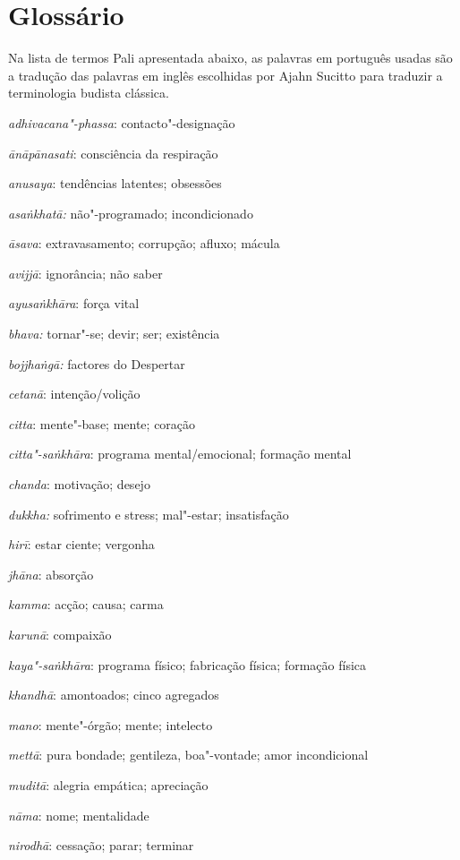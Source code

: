 {  \section{Glossário}\label{glossuxe1rio}

  Na lista de termos Pali apresentada abaixo, as palavras em português usadas são a tradução das palavras em inglês escolhidas por Ajahn Sucitto para traduzir a terminologia budista clássica.

  \emph{adhivacana"-phassa}: contacto"-designação

  \emph{ānāpānasati}: consciência da respiração

  \emph{anusaya}: tendências latentes; obsessões

  \emph{asaṅkhatā:} não"-programado; incondicionado

  \emph{āsava}: extravasamento; corrupção; afluxo; mácula

  \emph{avijjā}: ignorância; não saber

  \emph{ayusaṅkhāra}: força vital

  \emph{bhava:} tornar"-se; devir; ser; existência

  \emph{bojjhaṅgā:} factores do Despertar

  \emph{cetanā}: intenção/volição

  \emph{citta}: mente"-base; mente; coração

  \emph{citta"-saṅkhāra}: programa mental/emocional; formação mental

  \emph{chanda}: motivação; desejo

  \emph{dukkha:} sofrimento e stress; mal"-estar; insatisfação

  \emph{hirī}: estar ciente; vergonha

  \emph{jhāna}: absorção

  \emph{kamma}: acção; causa; carma

  \emph{karunā}: compaixão

  \emph{kaya"-saṅkhāra}: programa físico; fabricação física; formação física

  \emph{khandhā}: amontoados; cinco agregados

  \emph{mano}: mente"-órgão; mente; intelecto

  \emph{mettā}: pura bondade; gentileza, boa"-vontade; amor incondicional

  \emph{muditā}: alegria empática; apreciação

  \emph{nāma}: nome; mentalidade

  \emph{nirodhā}: cessação; parar; terminar

}
